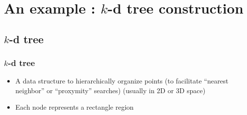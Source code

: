 \documentclass[12pt,dvipdfmx]{beamer}
\begin{document}
\section{An example :  $k$-d tree construction}

\subsection{$k$-d tree}

\begin{frame}
\frametitle{$k$-d tree}
\begin{itemize}
\item A data structure to hierarchically organize
  points (to facilitate ``nearest neighbor'' or ``proxymity'' searches)
  (usually in 2D or 3D space)
\item Each node represents a rectangle region
\end{itemize}

\begin{center}
\def\svgwidth{0.5\textwidth}
  
\end{center}
\end{frame}
\end{document}
